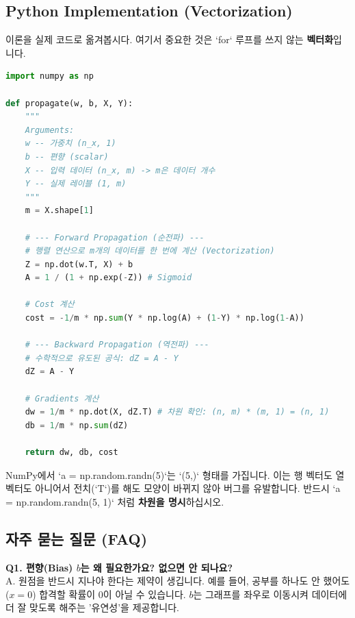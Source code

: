 \documentclass[11pt,a4paper]{book}
\theoremstyle{definition}
\begin{document}
\subsection{Python Implementation (Vectorization)}

이론을 실제 코드로 옮겨봅시다. 여기서 중요한 것은 `for` 루프를 쓰지 않는 \textbf{벡터화}입니다.

\begin{lstlisting}[language=Python, caption=Vectorized Logistic Regression, breaklines=true]
import numpy as np

def propagate(w, b, X, Y):
    """
    Arguments:
    w -- 가중치 (n_x, 1)
    b -- 편향 (scalar)
    X -- 입력 데이터 (n_x, m) -> m은 데이터 개수
    Y -- 실제 레이블 (1, m)
    """
    m = X.shape[1]
    
    # --- Forward Propagation (순전파) ---
    # 행렬 연산으로 m개의 데이터를 한 번에 계산 (Vectorization)
    Z = np.dot(w.T, X) + b  
    A = 1 / (1 + np.exp(-Z)) # Sigmoid
    
    # Cost 계산
    cost = -1/m * np.sum(Y * np.log(A) + (1-Y) * np.log(1-A))
    
    # --- Backward Propagation (역전파) ---
    # 수학적으로 유도된 공식: dZ = A - Y
    dZ = A - Y
    
    # Gradients 계산
    dw = 1/m * np.dot(X, dZ.T) # 차원 확인: (n, m) * (m, 1) = (n, 1)
    db = 1/m * np.sum(dZ)
    
    return dw, db, cost
\end{lstlisting}

\begin{warningbox}[title={주의: Rank-1 Array Pitfall}]
NumPy에서 `a = np.random.randn(5)`는 `(5,)` 형태를 가집니다. 이는 행 벡터도 열 벡터도 아니어서 전치(`T`)를 해도 모양이 바뀌지 않아 버그를 유발합니다.
반드시 `a = np.random.randn(5, 1)` 처럼 \textbf{차원을 명시}하십시오.
\end{warningbox}

\subsection{자주 묻는 질문 (FAQ)}

\textbf{Q1. 편향(Bias) $b$는 왜 필요한가요? 없으면 안 되나요?} \\
A. 원점을 반드시 지나야 한다는 제약이 생깁니다. 예를 들어, 공부를 하나도 안 했어도($x=0$) 합격할 확률이 0이 아닐 수 있습니다. $b$는 그래프를 좌우로 이동시켜 데이터에 더 잘 맞도록 해주는 '유연성'을 제공합니다.
\end{document}
